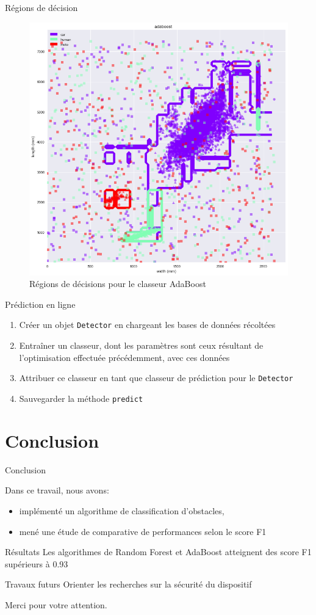 \documentclass[usenames,dvipsnames]{beamer}
\begin{document}
\begin{frame}{Régions de décision}
\begin{figure}
\centering
\includegraphics[width=.58\textwidth]{img/adaboost_contour.png}
\caption{Régions de décisions pour le classeur AdaBoost}
\end{figure}
\end{frame}

\begin{frame}{Prédiction en ligne}
\begin{enumerate}
\item Créer un objet \texttt{Detector} en chargeant les bases de données récoltées
\item Entraîner un classeur, dont les paramètres sont ceux résultant de l'optimisation effectuée précédemment, avec ces données
\item Attribuer ce classeur en tant que classeur de prédiction pour le \texttt{Detector}
\item Sauvegarder la méthode \texttt{predict}
\end{enumerate}
\end{frame}

\section{Conclusion}
\begin{frame}{Conclusion}

Dans ce travail, nous avons:
\begin{itemize}

\item implémenté un algorithme de classification d’obstacles,

\item mené une étude de comparative de performances selon le score F1

\end{itemize} 

\medskip
\begin{block}{Résultats}
Les algorithmes de Random Forest et AdaBoost atteignent des score F1 supérieurs à 0.93
\end{block}


\begin{block}{Travaux futurs}
Orienter les recherches sur la sécurité du dispositif
\end{block}


\end{frame}

\begin{frame}
\begin{center}

\begin{Huge}
\color{Blue}Merci pour votre attention.
\end{Huge}
\end{center}
\end{frame}
\end{document}
